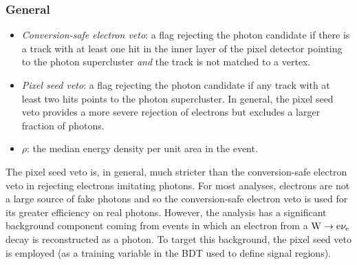 \subsubsection*{General}
\begin{itemize}
    \item \emph{Conversion-safe electron veto}: a flag rejecting the photon candidate if there is a track with at least one hit in the inner layer of the pixel detector pointing to the photon supercluster \emph{and} the track is not matched to a vertex. 
    \item \emph{Pixel seed veto}: a flag rejecting the photon candidate if any track with at least two hits points to the photon supercluster. In general, the pixel seed veto provides a more severe rejection of electrons but excludes a larger fraction of photons.
    \item $\rho$: the median energy density per unit area in the event. 
\end{itemize}

The pixel seed veto is, in general, much stricter than the conversion-safe electron veto in rejecting electrons imitating photons.
For most \Hgg analyses, electrons are not a large source of fake photons and so the conversion-safe electron veto is used for its greater efficiency on real photons.
However, the \ttH analysis has a significant background component coming from \ttplusX events in which an electron from a $\mathrm{W} \to \mathrm{e}\nu_{\mathrm{e}}$ decay is reconstructed as a photon.
To target this background, the pixel seed veto is employed (as a training variable in the BDT used to define signal regions).

